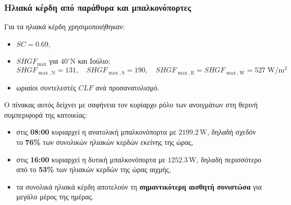 \documentclass[12pt,a4paper]{article}
\begin{document}
\subsubsection{Ηλιακά κέρδη από παράθυρα και μπαλκονόπορτες}

Για τα ηλιακά κέρδη χρησιμοποιήθηκαν:

\begin{itemize}
\item \(SC = 0.69\),
\item \(SHGF_{\max}\) για \(40^\circ\mathrm{N}\) και Ιούλιο:
\[
SHGF_{\max,\mathrm{N}} = 131,\quad
SHGF_{\max,\mathrm{S}} = 190,\quad
SHGF_{\max,\mathrm{E}} = SHGF_{\max,\mathrm{W}} = 527\;\mathrm{W/m^2}
\]
\item ωριαίοι συντελεστές \(CLF\) ανά προσανατολισμό.
\end{itemize}

\begin{table}[H]
\centering
\caption{Ηλιακά κέρδη από διαφανή στοιχεία}
\end{table}

Ο πίνακας αυτός δείχνει με σαφήνεια τον κυρίαρχο ρόλο των ανοιγμάτων στη θερινή
συμπεριφορά της κατοικίας:

\begin{itemize}
\item στις \textbf{08:00} κυριαρχεί η ανατολική μπαλκονόπορτα με
\(2199.2\,\mathrm{W}\), δηλαδή σχεδόν το \textbf{76\%} των συνολικών ηλιακών κερδών εκείνης της ώρας,
\item στις \textbf{16:00} κυριαρχεί η δυτική μπαλκονόπορτα με
\(1252.3\,\mathrm{W}\), δηλαδή περισσότερο από το \textbf{53\%} των ηλιακών κερδών της ώρας αιχμής,
\item τα συνολικά ηλιακά κέρδη αποτελούν τη \textbf{σημαντικότερη αισθητή συνιστώσα}
για μεγάλο μέρος της ημέρας.
\end{itemize}
\end{document}
